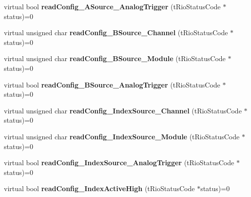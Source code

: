 \begin{DoxyCompactItemize}
\item 
\hypertarget{classnFPGA_1_1nFRC__2012__1__6__4_1_1tEncoder_a5299abfb561e2f72871ab7107a4f99f8}{
virtual bool {\bfseries readConfig\_\-ASource\_\-AnalogTrigger} (tRioStatusCode $\ast$status)=0}
\label{classnFPGA_1_1nFRC__2012__1__6__4_1_1tEncoder_a5299abfb561e2f72871ab7107a4f99f8}

\item 
\hypertarget{classnFPGA_1_1nFRC__2012__1__6__4_1_1tEncoder_a355be70275dfa1ddf1a43995107dbbc3}{
virtual unsigned char {\bfseries readConfig\_\-BSource\_\-Channel} (tRioStatusCode $\ast$status)=0}
\label{classnFPGA_1_1nFRC__2012__1__6__4_1_1tEncoder_a355be70275dfa1ddf1a43995107dbbc3}

\item 
\hypertarget{classnFPGA_1_1nFRC__2012__1__6__4_1_1tEncoder_a55fbb265074e4d2c65cae172dd9ef6ee}{
virtual unsigned char {\bfseries readConfig\_\-BSource\_\-Module} (tRioStatusCode $\ast$status)=0}
\label{classnFPGA_1_1nFRC__2012__1__6__4_1_1tEncoder_a55fbb265074e4d2c65cae172dd9ef6ee}

\item 
\hypertarget{classnFPGA_1_1nFRC__2012__1__6__4_1_1tEncoder_a153534c8f510f5fb49f3ea7883834fae}{
virtual bool {\bfseries readConfig\_\-BSource\_\-AnalogTrigger} (tRioStatusCode $\ast$status)=0}
\label{classnFPGA_1_1nFRC__2012__1__6__4_1_1tEncoder_a153534c8f510f5fb49f3ea7883834fae}

\item 
\hypertarget{classnFPGA_1_1nFRC__2012__1__6__4_1_1tEncoder_ac4de46761aef1a50c1f8de262d5d8085}{
virtual unsigned char {\bfseries readConfig\_\-IndexSource\_\-Channel} (tRioStatusCode $\ast$status)=0}
\label{classnFPGA_1_1nFRC__2012__1__6__4_1_1tEncoder_ac4de46761aef1a50c1f8de262d5d8085}

\item 
\hypertarget{classnFPGA_1_1nFRC__2012__1__6__4_1_1tEncoder_a2ad3d2fc369073c36e501da450e48ed4}{
virtual unsigned char {\bfseries readConfig\_\-IndexSource\_\-Module} (tRioStatusCode $\ast$status)=0}
\label{classnFPGA_1_1nFRC__2012__1__6__4_1_1tEncoder_a2ad3d2fc369073c36e501da450e48ed4}

\item 
\hypertarget{classnFPGA_1_1nFRC__2012__1__6__4_1_1tEncoder_aa56105c620a42301a357fbf1a8f4ad32}{
virtual bool {\bfseries readConfig\_\-IndexSource\_\-AnalogTrigger} (tRioStatusCode $\ast$status)=0}
\label{classnFPGA_1_1nFRC__2012__1__6__4_1_1tEncoder_aa56105c620a42301a357fbf1a8f4ad32}

\item 
\hypertarget{classnFPGA_1_1nFRC__2012__1__6__4_1_1tEncoder_aae64697b7156aac735483b2329f9b8a8}{
virtual bool {\bfseries readConfig\_\-IndexActiveHigh} (tRioStatusCode $\ast$status)=0}
\label{classnFPGA_1_1nFRC__2012__1__6__4_1_1tEncoder_aae64697b7156aac735483b2329f9b8a8}


\end{DoxyCompactItemize}
